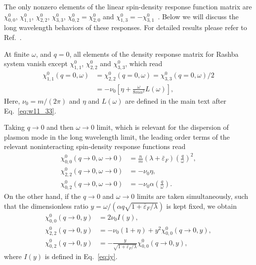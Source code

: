 \documentclass[aps, pra, reprint,superscriptaddress]{revtex4-1}
\def\be{\begin{equation}}
\def\ee{\end{equation}}
\begin{document}
The only nonzero elements of the linear spin-density response function matrix are $\chi^{0}_{0,0}$, $\chi^{0}_{1,1}$, $\chi^{0}_{2,2}$, $\chi^{0}_{3,3}$, $\chi^{0}_{0,2}=\chi^{0}_{2,0}$ and $\chi^{0}_{1,3}=-\chi^{0}_{3,1}$~\cite{Maiti2015}. Below we will discuss the long wavelength behaviors of these responses. For detailed results please refer to Ref.~\cite{Maiti2015}. 

At finite $\omega$, and $q=0$, all elements of the density response matrix for Rashba system vanish except $\chi^{0}_{1,1}$, $\chi^{0}_{2,2}$ and $\chi^{0}_{3,3}$, which read
\be\label{eq:q=0}
\begin{split}
\chi^{0}_{1,1}(q= 0,\omega)&=
\chi^{0}_{2,2}(q= 0,\omega)=
\chi^{0}_{3,3}(q= 0,\omega)/2
\\
&=-\nu_0\left[\eta+\frac{\omega}{8 m \alpha^2}L(\omega)\right],
\end{split}
\ee
Here, $\nu_0=m/(2\pi)$ and $\eta$ and $L(\omega)$ are defined in the main text after Eq.~\eqref{eq:w11_33}.

Taking $q \to 0$ and then $\omega \to 0$ limit, which is relevant for the dispersion of plasmon mode in the long wavelength limit, the leading order terms of the relevant noninteracting spin-density response functions read
\begin{equation}\label{eq:q-pl}
\begin{split}
\chi^{0}_{0,0}(q\to 0,\omega\to 0)&=\frac{n}{m}\left(\lambda+\bar{\varepsilon}_{F}\right) \left(\frac{q}{\omega}\right)^2,\\
\chi^{0}_{2,2}(q\to 0,\omega\to 0)&=-\nu_0\eta,\\
\chi^{0}_{0,2}(q\to 0,\omega \to 0)&=-\nu_0\alpha \left(\frac{q}{\omega}\right).
\end{split}
\end{equation} 
On the other hand, if the $q\to 0$ and $\omega \to 0$ limits are taken simultaneously, such that the dimensionless ratio $y=\omega/(\alpha q \sqrt{1+\bar{\varepsilon}_{F}/\lambda})$ is kept fixed, we obtain
\begin{equation}\label{eq:q-ac}
\begin{split}
\chi^{0}_{0,0}(q\to 0,y)&=2 \nu_0I(y), \\
\chi^{0}_{2,2}(q\to 0,y)&=-\nu_0(1+\eta)+y^2\chi^{0}_{0,0}(q\to 0,y),\\
\chi^{0}_{0,2}(q\to 0,y)&=-\frac{y }{\sqrt{1+\bar{\varepsilon}_{F}/\lambda}}\chi^{0}_{0,0}(q\to 0,y),
\end{split}
\end{equation} 
where $I(y)$ is defined in Eq.~\eqref{eq:iy}.
\end{document}
